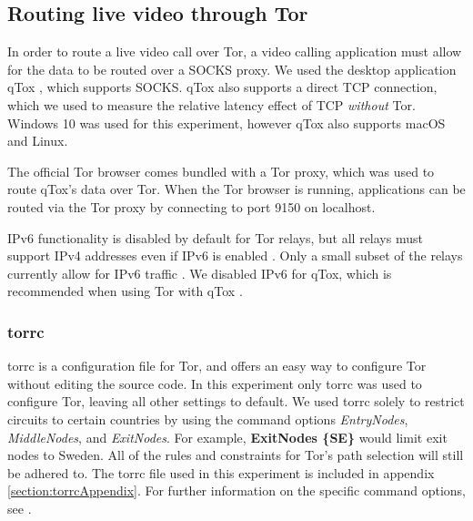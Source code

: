 \documentclass{kththesis}
\begin{document}
\subsection{Routing live video through Tor}
In order to route a live video call over Tor, a video calling application must allow for the data to be routed over a SOCKS proxy. We used the desktop application qTox \parencite{qTox}, which supports SOCKS. qTox also supports a direct TCP connection, which we used to measure the relative latency effect of TCP \emph{without} Tor. Windows 10 was used for this experiment, however qTox also supports macOS and Linux.

The official Tor browser comes bundled with a Tor proxy, which was used to route qTox's data over Tor. When the Tor browser is running, applications can be routed via the Tor proxy by connecting to port 9150 on localhost.

IPv6 functionality is disabled by default for Tor relays, but all relays must support IPv4 addresses even if IPv6 is enabled \parencite{TorIPv6}. Only a small subset of the relays currently allow for IPv6 traffic \parencite{TorMetricsIPv6}. We disabled IPv6 for qTox, which is recommended when using Tor with qTox \parencite{qToxOverTor}.

\subsubsection{torrc}
torrc is a configuration file for Tor, and offers an easy way to configure Tor without editing the source code. In this experiment only torrc was used to configure Tor, leaving all other settings to default. We used torrc solely to restrict circuits to certain countries by using the command options \emph{EntryNodes}, \emph{MiddleNodes}, and \emph{ExitNodes}. For example, \textbf{ExitNodes \{SE\}} would limit exit nodes to Sweden. All of the rules and constraints for Tor's path selection \parencite{TorPathSpecification} will still be adhered to. The torrc file used in this experiment is included in appendix \ref{section:torrcAppendix}. For further information on the specific command options, see \textcite{torrcmanpages}. 
\end{document}
